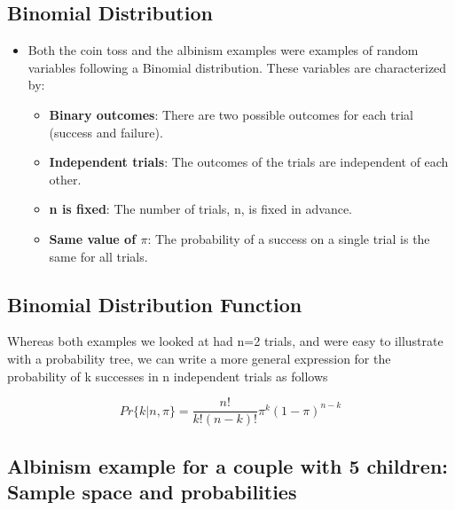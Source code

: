 \documentclass[
]{book}
\providecommand{\tightlist}{%
  \setlength{\itemsep}{0pt}\setlength{\parskip}{0pt}}
\begin{document}
\hypertarget{binomial-distribution}{%
\subsection{Binomial Distribution}\label{binomial-distribution}}

\begin{itemize}
\tightlist
\item
  Both the coin toss and the albinism examples were examples of random variables following a Binomial distribution. These variables are characterized by:

  \begin{itemize}
  \tightlist
  \item
    \textbf{Binary outcomes}: There are two possible outcomes for each trial (success and failure).
  \item
    \textbf{Independent trials}: The outcomes of the trials are independent of each other.
  \item
    \textbf{n is fixed}: The number of trials, n, is fixed in advance.
  \item
    \textbf{Same value of \(\pi\)}: The probability of a success on a single trial is the same for all trials.
  \end{itemize}
\end{itemize}

\hypertarget{binomial-distribution-function}{%
\subsection{Binomial Distribution Function}\label{binomial-distribution-function}}

Whereas both examples we looked at had n=2 trials, and were easy to illustrate with a probability tree, we can write a more general expression for the probability of k successes in n independent trials as follows

\[Pr\{k|n,\pi\} = \frac{n!}{k!(n-k)!}\pi^k(1-\pi)^{n-k}\]

\hypertarget{albinism-example-for-a-couple-with-5-children-sample-space-and-probabilities}{%
\subsection{Albinism example for a couple with 5 children: Sample space and probabilities}\label{albinism-example-for-a-couple-with-5-children-sample-space-and-probabilities}}
\end{document}
